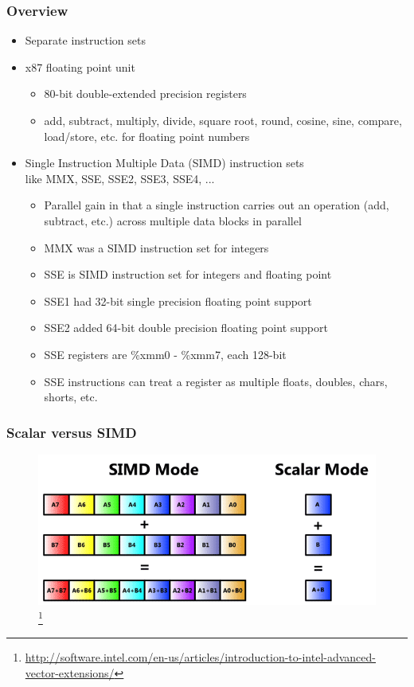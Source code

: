\documentclass[11pt,xcolor=dvipsnames]{beamer}
\begin{document}
\begin{frame}[fragile,t]
\frametitle{Overview}
\begin{itemize}
  \item Separate instruction sets
  \item x87 floating point unit
  \begin{itemize}
    \item 80-bit double-extended precision registers
    \item add, subtract, multiply, divide, square root, round, cosine, sine, compare, load/store, etc. for floating point numbers
  \end{itemize}
  \pause
  \item Single Instruction Multiple Data (SIMD) instruction sets \\ like MMX, SSE, SSE2, SSE3, SSE4, ...
  \begin{itemize}
    \item Parallel gain in that a single instruction carries out an operation (add, subtract, etc.) across multiple data blocks in parallel
    \item MMX was a SIMD instruction set for integers
    \pause
    \item SSE is SIMD instruction set for integers and floating point
    \pause
    \item SSE1 had 32-bit single precision floating point support 
    \item SSE2 added 64-bit double precision floating point support
    \pause
    \item SSE registers are {\%xmm0 - \%xmm7}, each 128-bit
    \item SSE instructions can treat a register as multiple floats, doubles, chars, shorts, etc.
  \end{itemize}
\end{itemize}
\end{frame}

\begin{frame}[fragile,t]
\frametitle{Scalar versus SIMD}
\begin{figure}
\centering
\includegraphics[width=\textwidth]{figures/simd.png}
\footnote{\url{http://software.intel.com/en-us/articles/introduction-to-intel-advanced-vector-extensions/}}
\end{figure}
\end{frame}
\end{document}

